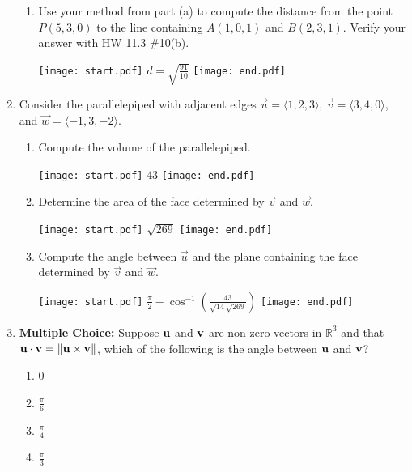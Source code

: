 \documentclass[12pt]{article}
\begin{document}
\begin{enumerate}
\begin{enumerate}
\item Use your method from part (a) to compute the distance from the point $P(5,3,0)$ to the line containing $A(1,0,1)$ and $B(2,3,1)$.  Verify your answer with HW 11.3 \#10(b).

\texttt{[image: start.pdf]}
{{$d=\sqrt{\frac{91}{10}}$}}
\texttt{[image: end.pdf]}


\end{enumerate}

\item Consider the parallelepiped with adjacent edges $\overrightarrow{u}=\langle1,2,3\rangle$, $\overrightarrow{v}=\langle3,4,0\rangle$, and $\overrightarrow{w}=\langle-1,3,-2\rangle$.

\begin{enumerate}

\item Compute the volume of the parallelepiped.

\texttt{[image: start.pdf]}
{{43}}
\texttt{[image: end.pdf]}


\item Determine the area of the face determined by $\overrightarrow{v}$ and $\overrightarrow{w}$.

\texttt{[image: start.pdf]}
{{$\sqrt{269}$}}
\texttt{[image: end.pdf]}


\item Compute the angle between $\overrightarrow{u}$ and the plane containing the face determined by $\overrightarrow{v}$ and $\overrightarrow{w}$.

\texttt{[image: start.pdf]}
{{$\frac{\pi}{2}-\cos^{-1}\left(\frac{43}{\sqrt{14}\sqrt{269}}\right)$}}
\texttt{[image: end.pdf]}


\end{enumerate}

\item {\bf Multiple Choice:} Suppose ${\bf u}$ and ${\bf v}$ are non-zero vectors in $\mathbb{R}^3$ and that ${\bf u}\cdot{\bf v}=\|{\bf u}\times{\bf v}\|$, which of the following is the angle between ${\bf u}$ and ${\bf v}$?

\begin{enumerate}

\item 0

\item $\frac{\pi}{6}$

\item $\frac{\pi}{4}$

\item $\frac{\pi}{3}$


\end{enumerate}
\end{enumerate}
\end{document}
